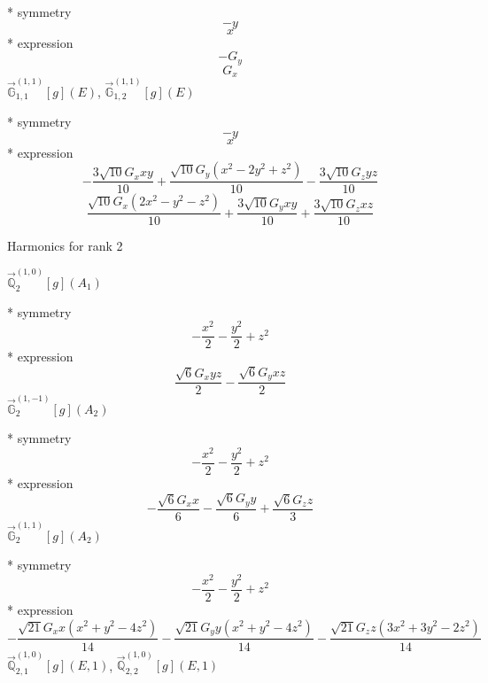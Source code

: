 \documentclass[fleqn,8pt]{jsarticle}
\begin{document}
\noindent\quad ** symmetry
\begin{dmath*}
- y
\end{dmath*}
\begin{dmath*}
x
\end{dmath*}
\noindent\quad ** expression
\begin{dmath*}
- G_{y}
\end{dmath*}
\begin{dmath*}
G_{x}
\end{dmath*}
\noindent\quad $\vec{\mathbb{G}}_{1,1}^{(1,1)}[g](E)$, $\vec{\mathbb{G}}_{1,2}^{(1,1)}[g](E)$

\noindent\quad ** symmetry
\begin{dmath*}
- y
\end{dmath*}
\begin{dmath*}
x
\end{dmath*}
\noindent\quad ** expression
\begin{dmath*}
- \frac{3 \sqrt{10} G_{x} x y}{10} + \frac{\sqrt{10} G_{y} \left(x^{2} - 2 y^{2} + z^{2}\right)}{10} - \frac{3 \sqrt{10} G_{z} y z}{10}
\end{dmath*}
\begin{dmath*}
\frac{\sqrt{10} G_{x} \left(2 x^{2} - y^{2} - z^{2}\right)}{10} + \frac{3 \sqrt{10} G_{y} x y}{10} + \frac{3 \sqrt{10} G_{z} x z}{10}
\end{dmath*}

\noindent * Harmonics for rank 2

\noindent\quad $\vec{\mathbb{Q}}_{2}^{(1,0)}[g](A_{1})$

\noindent\quad ** symmetry
\begin{dmath*}
- \frac{x^{2}}{2} - \frac{y^{2}}{2} + z^{2}
\end{dmath*}
\noindent\quad ** expression
\begin{dmath*}
\frac{\sqrt{6} G_{x} y z}{2} - \frac{\sqrt{6} G_{y} x z}{2}
\end{dmath*}
\noindent\quad $\vec{\mathbb{G}}_{2}^{(1,-1)}[g](A_{2})$

\noindent\quad ** symmetry
\begin{dmath*}
- \frac{x^{2}}{2} - \frac{y^{2}}{2} + z^{2}
\end{dmath*}
\noindent\quad ** expression
\begin{dmath*}
- \frac{\sqrt{6} G_{x} x}{6} - \frac{\sqrt{6} G_{y} y}{6} + \frac{\sqrt{6} G_{z} z}{3}
\end{dmath*}
\noindent\quad $\vec{\mathbb{G}}_{2}^{(1,1)}[g](A_{2})$

\noindent\quad ** symmetry
\begin{dmath*}
- \frac{x^{2}}{2} - \frac{y^{2}}{2} + z^{2}
\end{dmath*}
\noindent\quad ** expression
\begin{dmath*}
- \frac{\sqrt{21} G_{x} x \left(x^{2} + y^{2} - 4 z^{2}\right)}{14} - \frac{\sqrt{21} G_{y} y \left(x^{2} + y^{2} - 4 z^{2}\right)}{14} - \frac{\sqrt{21} G_{z} z \left(3 x^{2} + 3 y^{2} - 2 z^{2}\right)}{14}
\end{dmath*}
\noindent\quad $\vec{\mathbb{Q}}_{2,1}^{(1,0)}[g](E,1)$, $\vec{\mathbb{Q}}_{2,2}^{(1,0)}[g](E,1)$
\end{document}
